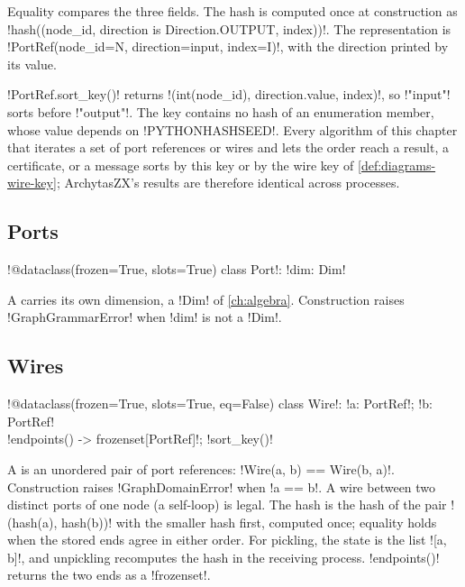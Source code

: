 Equality compares the three fields. The hash is computed once at construction as \py!hash((node_id, direction is Direction.OUTPUT, index))!. The representation is \code!PortRef(node_id=N, direction=input, index=I)!, with the direction printed by its value.

\begin{definition}\label{def:diagrams-portref-key}
\py!PortRef.sort_key()! returns \py!(int(node_id), direction.value, index)!, so \code!"input"! sorts before \code!"output"!. The key contains no hash of an enumeration member, whose value depends on \code!PYTHONHASHSEED!. Every algorithm of this chapter that iterates a set of port references or wires and lets the order reach a result, a certificate, or a message sorts by this key or by the wire key of \cref{def:diagrams-wire-key}; ArchytasZX's results are therefore identical across processes.
\end{definition}

\subsection{Ports}

\begin{signature}
\py!@dataclass(frozen=True, slots=True) class Port!: \py!dim: Dim!
\end{signature}

A  carries its own dimension, a \py!Dim! of \cref{ch:algebra}. Construction raises \py!GraphGrammarError! when \py!dim! is not a \py!Dim!.

\subsection{Wires}

\begin{signature}
\py!@dataclass(frozen=True, slots=True, eq=False) class Wire!: \py!a: PortRef!; \py!b: PortRef!\\
\quad \py!endpoints() -> frozenset[PortRef]!; \py!sort_key()!
\end{signature}

A  is an unordered pair of port references: \py!Wire(a, b) == Wire(b, a)!. Construction raises \py!GraphDomainError! when \py!a == b!. A wire between two distinct ports of one node (a self-loop) is legal. The hash is the hash of the pair \py!(hash(a), hash(b))! with the smaller hash first, computed once; equality holds when the stored ends agree in either order. For pickling, the state is the list \py![a, b]!, and unpickling recomputes the hash in the receiving process. \py!endpoints()! returns the two ends as a \py!frozenset!.

